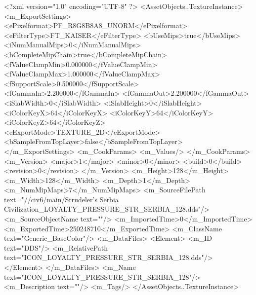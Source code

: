 <?xml version="1.0" encoding="UTF-8" ?>
<AssetObjects..TextureInstance>
	<m_ExportSettings>
		<ePixelformat>PF_R8G8B8A8_UNORM</ePixelformat>
		<eFilterType>FT_KAISER</eFilterType>
		<bUseMips>true</bUseMips>
		<iNumManualMips>0</iNumManualMips>
		<bCompleteMipChain>true</bCompleteMipChain>
		<fValueClampMin>0.000000</fValueClampMin>
		<fValueClampMax>1.000000</fValueClampMax>
		<fSupportScale>0.500000</fSupportScale>
		<fGammaIn>2.200000</fGammaIn>
		<fGammaOut>2.200000</fGammaOut>
		<iSlabWidth>0</iSlabWidth>
		<iSlabHeight>0</iSlabHeight>
		<iColorKeyX>64</iColorKeyX>
		<iColorKeyY>64</iColorKeyY>
		<iColorKeyZ>64</iColorKeyZ>
		<eExportMode>TEXTURE_2D</eExportMode>
		<bSampleFromTopLayer>false</bSampleFromTopLayer>
	</m_ExportSettings>
	<m_CookParams>
		<m_Values/>
	</m_CookParams>
	<m_Version>
		<major>1</major>
		<minor>0</minor>
		<build>0</build>
		<revision>0</revision>
	</m_Version>
	<m_Height>128</m_Height>
	<m_Width>128</m_Width>
	<m_Depth>1</m_Depth>
	<m_NumMipMaps>7</m_NumMipMaps>
	<m_SourceFilePath text="//civ6/main/Strudeler's Serbia Civilization\ArtFiles\ICON_LOYALTY_PRESSURE_STR_SERBIA_128.dds"/>
	<m_SourceObjectName text=""/>
	<m_ImportedTime>0</m_ImportedTime>
	<m_ExportedTime>250248710</m_ExportedTime>
	<m_ClassName text="Generic_BaseColor"/>
	<m_DataFiles>
		<Element>
			<m_ID text="DDS"/>
			<m_RelativePath text="ICON_LOYALTY_PRESSURE_STR_SERBIA_128.dds"/>
		</Element>
	</m_DataFiles>
	<m_Name text="ICON_LOYALTY_PRESSURE_STR_SERBIA_128"/>
	<m_Description text=""/>
	<m_Tags/>
</AssetObjects..TextureInstance>

